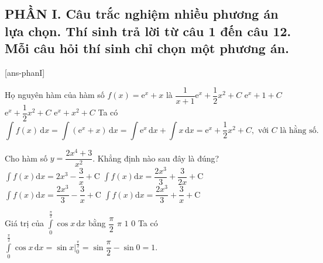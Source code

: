\documentclass[12pt,a4paper]{article}
\begin{document}
      \subsection*{PHẦN I. Câu trắc nghiệm nhiều phương án lựa chọn. Thí sinh trả lời từ câu 1 đến câu 12. Mỗi câu hỏi thí sinh chỉ chọn một phương án.}
    \setcounter{ex}{0}
    [ans-phanI]
    \begin{ex}%
	Họ nguyên hàm của hàm số $f(x)=\mathrm{e}^x + x$ là
	\choice
{$\dfrac{1}{x  + 1}\mathrm{e}^x + \dfrac{1}{2}x^2 + C$}
{$\mathrm{e}^x + 1 + C$}
{\True $\mathrm{e}^x + \dfrac{1}{2}x^2 + C$}
{$\mathrm{e}^x + x^2 + C$}
	\loigiai
	{
		Ta có
		$$\displaystyle\int f(x) \mathrm{\,d}x = \displaystyle\int(\mathrm{e}^x+x)\mathrm{\,d}x = \displaystyle\int \mathrm{e}^x \mathrm{\,d}x + \displaystyle\int x \mathrm{\,d}x = \mathrm{e}^x+\dfrac{1}{2}x^2+C, \text{ với } C \text{ là hằng số}.$$
	}
\end{ex}
\begin{ex}%
	Cho hàm số $y = \dfrac{2x^4 + 3}{x^2}$. Khẳng định nào sau đây là đúng?
	\choice
{$ \displaystyle\int\limits f(x)\mathrm{d}x = 2x^3 - \dfrac{3}{x} + \mathrm{C} $}
{$ \displaystyle\int\limits f(x)\mathrm{d}x = \dfrac{2x^3}{3} + \dfrac{3}{2x} + \mathrm{C} $}
{\True $ \displaystyle\int\limits f(x)\mathrm{d}x = \dfrac{2x^3}{3} - \dfrac{3}{x} + \mathrm{C} $}
{$ \displaystyle\int\limits f(x)\mathrm{d}x = \dfrac{2x^3}{3} + \dfrac{3}{x} + \mathrm{C} $}
\end{ex}
\begin{ex}%
	Giá trị của $\displaystyle\int\limits_0^{\frac{\pi}{2}} \cos x\mathrm{\,d}x$ bằng
	\choice
{$\dfrac{\pi}{2}$}
{$\pi$}
{\True $1$}
{$0$}
	\loigiai
	{
		Ta có $\displaystyle\int\limits_0^{\frac{\pi}{2}} \cos x\mathrm{\,d}x = \sin x\Big|_0^{\frac{\pi}{2}} = \sin\dfrac{\pi}{2}-\sin 0 = 1$.
	}
\end{ex}
\end{document}
